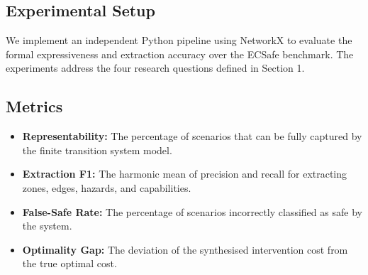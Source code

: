 \subsection{Experimental Setup}
We implement an independent Python pipeline using NetworkX to evaluate the formal expressiveness and extraction accuracy over the ECSafe benchmark. The experiments address the four research questions defined in Section 1.

\subsection{Metrics}
\begin{itemize}
    \item \textbf{Representability:} The percentage of scenarios that can be fully captured by the finite transition system model.
    \item \textbf{Extraction F1:} The harmonic mean of precision and recall for extracting zones, edges, hazards, and capabilities.
    \item \textbf{False-Safe Rate:} The percentage of scenarios incorrectly classified as safe by the system.
    \item \textbf{Optimality Gap:} The deviation of the synthesised intervention cost from the true optimal cost.
\end{itemize}
